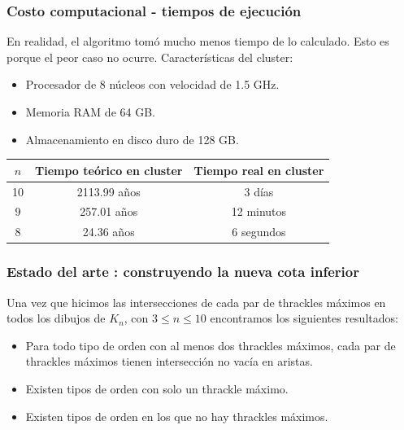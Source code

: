 %
\begin{frame}
\frametitle{Costo computacional - tiempos de ejecución}
En realidad, el algoritmo tomó mucho menos tiempo de lo calculado. Esto es porque el peor caso no ocurre. 
Características del cluster: 
\begin{itemize}
	\item Procesador de 8 núcleos con velocidad de 1.5 GHz.
	\item Memoria RAM de 64 GB.
	\item Almacenamiento en disco duro de 128 GB.
\end{itemize} 
\begin{table}
	\centering
	\begin{tabular}{|c|c|c|}
		\hline
		$n$      & Tiempo teórico en cluster & Tiempo real en cluster \\ \hline
		10       &     2113.99 años          & 3 días \\   \hline
		9        &     257.01 años           & 12 minutos \\    \hline
		8        &     24.36 años            & 6 segundos \\  \hline
	\end{tabular}
\end{table}
\end{frame}
\begin{frame}
\frametitle{Estado del arte : construyendo la nueva cota inferior}
Una vez que hicimos las intersecciones de cada par de thrackles máximos en todos los dibujos de $K_n$, con $3 \leq n \leq 10$ encontramos los siguientes resultados:
\begin{itemize}
	\item Para todo tipo de orden con al menos dos thrackles máximos, cada par de thrackles máximos tienen intersección no vacía en aristas.
	\item Existen tipos de orden con solo un thrackle máximo.
	\item Existen tipos de orden en los que no hay thrackles máximos.
\end{itemize}
\end{frame}

